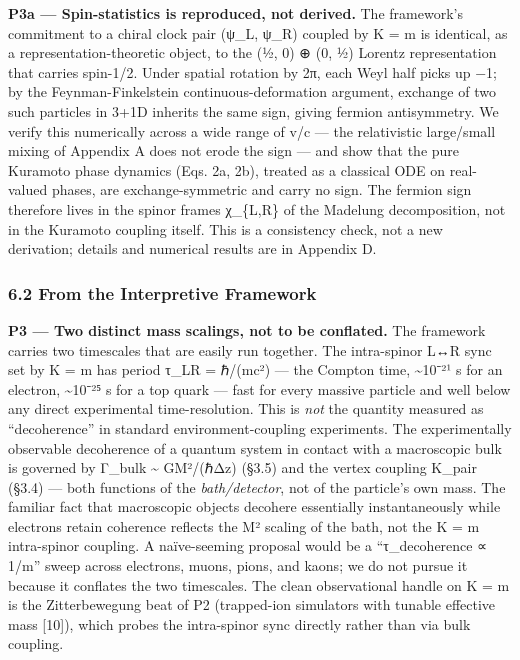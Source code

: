 \documentclass[
]{article}
\begin{document}
\textbf{P3a --- Spin-statistics is reproduced, not derived.} The
framework's commitment to a chiral clock pair (ψ\_L, ψ\_R) coupled by K
= m is identical, as a representation-theoretic object, to the (½, 0) ⊕
(0, ½) Lorentz representation that carries spin-1/2. Under spatial
rotation by 2π, each Weyl half picks up −1; by the Feynman-Finkelstein
continuous-deformation argument, exchange of two such particles in 3+1D
inherits the same sign, giving fermion antisymmetry. We verify this
numerically across a wide range of v/c --- the relativistic large/small
mixing of Appendix A does not erode the sign --- and show that the pure
Kuramoto phase dynamics (Eqs. 2a, 2b), treated as a classical ODE on
real-valued phases, are exchange-symmetric and carry no sign. The
fermion sign therefore lives in the spinor frames χ\_\{L,R\} of the
Madelung decomposition, not in the Kuramoto coupling itself. This is a
consistency check, not a new derivation; details and numerical results
are in Appendix D.

\subsubsection{6.2 From the Interpretive
Framework}\label{from-the-interpretive-framework}

\textbf{P3 --- Two distinct mass scalings, not to be conflated.} The
framework carries two timescales that are easily run together. The
intra-spinor L↔R sync set by K = m has period τ\_LR = ℏ/(mc²) --- the
Compton time, \textasciitilde10⁻²¹ s for an electron,
\textasciitilde10⁻²⁵ s for a top quark --- fast for every massive
particle and well below any direct experimental time-resolution. This is
\emph{not} the quantity measured as ``decoherence'' in standard
environment-coupling experiments. The experimentally observable
decoherence of a quantum system in contact with a macroscopic bulk is
governed by Γ\_bulk \textasciitilde{} GM²/(ℏΔz) (§3.5) and the vertex
coupling K\_pair (§3.4) --- both functions of the \emph{bath/detector},
not of the particle's own mass. The familiar fact that macroscopic
objects decohere essentially instantaneously while electrons retain
coherence reflects the M² scaling of the bath, not the K = m
intra-spinor coupling. A naïve-seeming proposal would be a
``τ\_decoherence ∝ 1/m'' sweep across electrons, muons, pions, and
kaons; we do not pursue it because it conflates the two timescales. The
clean observational handle on K = m is the Zitterbewegung beat of P2
(trapped-ion simulators with tunable effective mass {[}10{]}), which
probes the intra-spinor sync directly rather than via bulk coupling.
\end{document}

